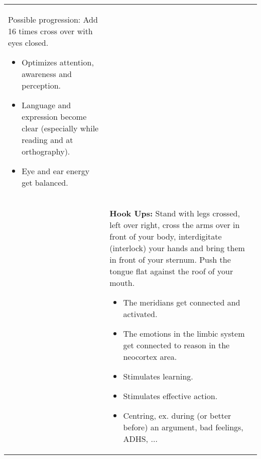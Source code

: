 \documentclass[../main.tex]{subfiles}
\begin{document}
{\begin{tabular}{p{2cm} p{10cm}}
{{Possible progression:}} Add 16 times cross over with eyes closed.
\begin{itemize}[noitemsep]
	\item Optimizes attention, awareness and perception.
	\item Language and expression become clear (especially while reading and at orthography).
	\item Eye and ear energy get balanced.
\end{itemize}
  \\
    \raisebox{-1.2\totalheight}{  \texttt{[image: Hookup]} }
  &
    \textbf{Hook Ups:} Stand with {legs crossed}, left over right, {cross the arms} over in front of your body, interdigitate (interlock) your hands and bring them {in front of your sternum}. Push the tongue flat against the roof of your mouth.

   
\begin{itemize}[noitemsep]
\item The meridians get connected and activated.
	\item The emotions in the limbic system get connected to reason in the neocortex area.
	\item Stimulates learning.
	\item Stimulates effective action.
	\item Centring, ex. during (or better before) an argument, bad feelings, ADHS, $\ldots$
\end{itemize}

  \end{tabular}
}
\end{document}
